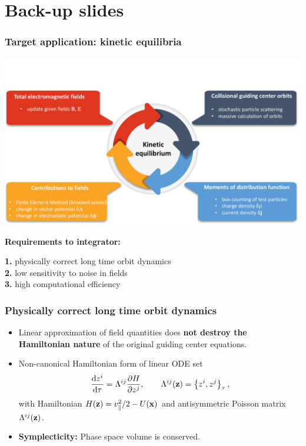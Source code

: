 \documentclass{beamer}
\newcommand{\be}[1]{\begin{equation} \label{#1}}
\newcommand{\ee}{\end{equation}}
\newcommand{\difp}[2]{\frac{\partial #1}{\partial #2}}
\newcommand{\bz}{{\bf z}}
\newcommand{\bx}{{\bf x}}
\newcommand{\rd}{{\rm d}}
\begin{document}
\section{Back-up slides}
\begin{frame}
\frametitle{Target application: kinetic equilibria}
	\begin{center}
	\vspace{-1.2cm}
	\includegraphics[trim={0 0 0 3cm},clip,width=\textwidth]{FIGURES/cycle01.pdf}
	\end{center}	
	\vspace{-0.5cm} 
	\textbf{Requirements to integrator:}\\
	\begin{footnotesize}
	\textbf{1.} physically correct long time orbit dynamics\\
	\textbf{2.} low sensitivity to noise in fields\\
	\textbf{3.} high computational efficiency	
	\end{footnotesize}
\end{frame}


\begin{frame}
\frametitle{Physically correct long time orbit dynamics}
\vspace{-0.5cm}
\begin{itemize}
	\item
	Linear approximation of field quantities does \textbf{not destroy the Hamiltonian nature} of the original guiding center equations.
	\item Non-canonical Hamiltonian form of linear ODE set
	\be{hamform}
	\frac{\rd z^i}{\rd \tau}=\Lambda^{ij}\difp{H}{z^j}, \qquad \Lambda^{ij}(\bz)=\left\{z^i,z^j\right\}_\tau,
	\ee
	with Hamiltonian $H(\bz)=v_\parallel^2/2-U(\bx)$ and antisymmetric Poisson matrix  $\Lambda^{ij}(\bz)$.
	\item \textbf{Symplecticity:} Phase space volume is conserved.
\end{itemize}

\end{frame}
\end{document}
